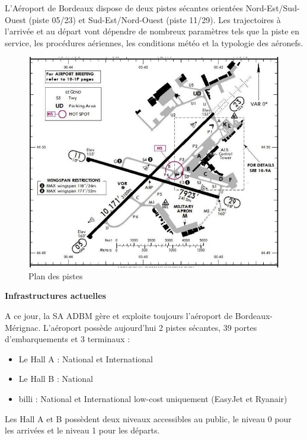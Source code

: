 L’Aéroport de Bordeaux dispose de deux pistes sécantes orientées Nord-Est/Sud-Ouest (piste 05/23) et Sud-Est/Nord-Ouest (piste 11/29). Les trajectoires à l’arrivée et au départ vont dépendre de nombreux paramètres tels que la piste en service, les procédures aériennes, les conditions météo et la typologie des aéronefs.\newline

\begin{figure}[hbt!]
  \centering
  \includegraphics[width=12.1cm]{Images/pistes.jpg}
  \caption{Plan des pistes}
  \label{fig:pistes}
\end{figure}

\newpage

\textbf{Infrastructures actuelles}\newline


A ce jour, la SA ADBM gère et exploite toujours l'aéroport de Bordeaux-Mérignac.
L'aéroport possède aujourd'hui 2 pistes sécantes, 39 portes d'embarquements et 3 terminaux :

\begin{itemize}
    \item Le Hall A : National et International
    \item Le Hall B : National
    \item billi : National et International low-cost uniquement (EasyJet et Ryanair)\newline
\end{itemize}

Les Hall A et B possèdent deux niveaux accessibles au public, le niveau 0 pour les arrivées et le niveau 1 pour les départs.

